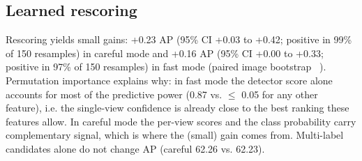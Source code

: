 \documentclass[10pt,twocolumn]{article}
\begin{document}
\subsection{Learned rescoring}
\begin{table}[t]\centering\small\caption{Learned rescoring on CarDD test. Fitted on val (18163 candidate boxes in careful mode); hyper-parameters (4 tree configurations $\times$ 5 iteration counts $\times$ 4 blends) chosen by out-of-fold AP.}\end{table}
Rescoring yields small gains: +0.23 AP (95\% CI +0.03 to +0.42; positive in 99\% of 150 resamples) in careful mode and +0.16 AP (95\% CI +0.00 to +0.33; positive in 97\% of 150 resamples) in fast mode (paired image bootstrap ~\cite{efron}). Permutation importance explains why: in fast mode the detector score alone accounts for most of the predictive power (0.87 vs. $\le$ 0.05 for any other feature), i.e. the single-view confidence is already close to the best ranking these features allow. In careful mode the per-view scores and the class probability carry complementary signal, which is where the (small) gain comes from. Multi-label candidates alone do not change AP (careful 62.26 vs. 62.23).
\end{document}
